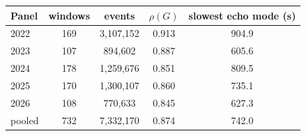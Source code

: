 \begin{tabular}{lcccc}
\toprule
Panel & windows & events & $\rho(G)$ & slowest echo mode (s) \\
\midrule
2022 & 169 & 3,107,152 & 0.913 & 904.9 \\
2023 & 107 & 894,602 & 0.887 & 605.6 \\
2024 & 178 & 1,259,676 & 0.851 & 809.5 \\
2025 & 170 & 1,300,107 & 0.860 & 735.1 \\
2026 & 108 & 770,633 & 0.845 & 627.3 \\
pooled & 732 & 7,332,170 & 0.874 & 742.0 \\
\bottomrule
\end{tabular}